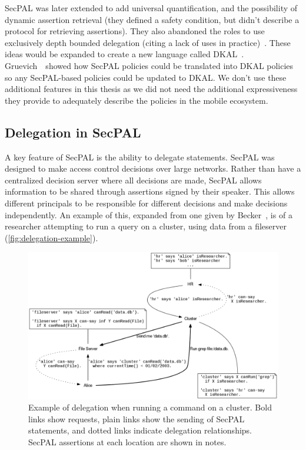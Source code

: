 \documentclass[thesis.tex]{subfiles}
\begin{document}
SecPAL was later extended to add universal quantification, and the
possibility of dynamic assertion retrieval (they defined a safety
condition, but didn't describe a protocol for retrieving assertions).
They also abandoned the roles to use exclusively depth bounded
delegation (citing a lack of uses in
practice)~\cite{moritz_y_becker_secpal:_2009}.  These ideas would be
expanded to create a new language called
DKAL~\cite{gurevich_dkal:_2008}.  Gruevich~\etal~showed how SecPAL
policies could be translated into DKAL
policies~\cite{gurevich_dkal:_2008} so any SecPAL-based policies could
be updated to DKAL.  We don't use these additional features in this
thesis as we did not need the additional expressiveness they provide
to adequately describe the policies in the mobile ecosystem.

\subsection{Delegation in SecPAL}

A key feature of SecPAL is the ability to delegate statements. SecPAL was
designed to make access control decisions over large networks. Rather than have
a centralized decision server where all decisions are made, SecPAL allows
information to be shared through assertions signed by their speaker. This allows
different principals to be responsible for different decisions and make
decisions independently. An example of this, expanded from one given by
Becker~\cite{becker_secpal:_2006}, is of a researcher attempting to run a query
on a cluster, using data from a fileserver (\autoref{fig:delegation-example}).

\begin{figure}
  \centering
  \includegraphics[width=\textwidth]{figures/secpal-example.png}
  \caption[Example of delegation on a cluster.]{Example of delegation when running a command on a cluster.  Bold links show requests, plain links show the sending of SecPAL statements, and dotted links indicate delegation relationships.  SecPAL assertions at each location are shown in notes.}
  \label{fig:delegation-example}
\end{figure}
\end{document}
